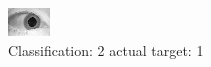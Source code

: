 \begin{figure}[h!]
\begin{center}
\includegraphics[width=0.60\columnwidth]{figures/ID1506_class_2_target_1.png}
\end{center}
\caption{ Classification: 2 actual target: 1}
\label{fig:ID1506_class_2_target_1}
\end{figure}
